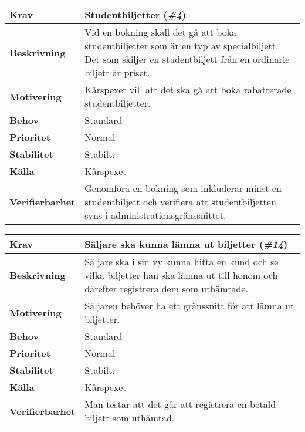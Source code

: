 \documentclass[a4paper, twoside, 11pt, titlepage]{article}
\begin{document}
		\begin{tabular} { p{2.6cm} p{12.5cm} }
			\hline
			\sffamily\textbf{Krav} & Studentbiljetter (\emph{\#4})  \\
			\hline
			\sffamily\textbf{Beskrivning} & Vid en bokning skall det gå att boka studentbiljetter som är en typ av specialbiljett. Det som skiljer en studentbiljett från en ordinarie biljett är priset.  \\
			\hline
			\sffamily\textbf{Motivering} & Kårspexet vill att det ska gå att boka rabatterade studentbiljetter.  \\
			\hline
			\sffamily\textbf{Behov} & Standard  \\
			\hline
			\sffamily\textbf{Prioritet} & Normal  \\
			\hline
			\sffamily\textbf{Stabilitet} & Stabilt.  \\
			\hline
			\sffamily\textbf{Källa} & Kårspexet  \\
			\hline
			\sffamily\textbf{Verifierbarhet} & Genomföra en bokning som inkluderar minst en studentbiljett och verifiera att studentbiljetten syns i administrationsgränssnittet.  \\
			\hline
		\end{tabular}
		\vspace{6mm}

		\begin{tabular} { p{2.6cm} p{12.5cm} }
			\hline
			\sffamily\textbf{Krav} & Säljare ska kunna lämna ut biljetter (\emph{\#14})  \\
			\hline
			\sffamily\textbf{Beskrivning} & Säljare ska i sin vy kunna hitta en kund och se vilka biljetter han ska lämna ut till honom och därefter registrera dem som uthämtade.  \\
			\hline
			\sffamily\textbf{Motivering} & Säljaren behöver ha ett gränssnitt för att lämna ut biljetter.  \\
			\hline
			\sffamily\textbf{Behov} & Standard  \\
			\hline
			\sffamily\textbf{Prioritet} & Normal  \\
			\hline
			\sffamily\textbf{Stabilitet} & Stabilt.  \\
			\hline
			\sffamily\textbf{Källa} & Kårspexet  \\
			\hline
			\sffamily\textbf{Verifierbarhet} & Man testar att det går att registrera en betald biljett som uthämtad.   \\
			\hline
		\end{tabular}
		\vspace{6mm}
\end{document}
